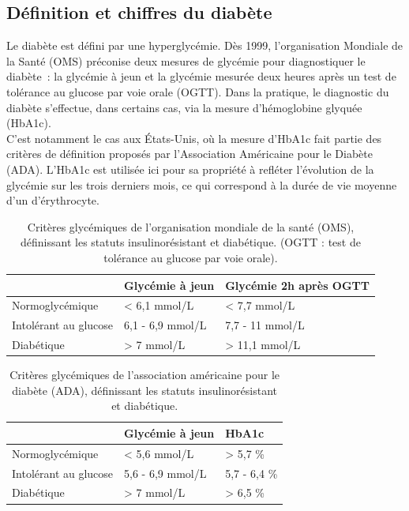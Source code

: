 \documentclass[11pt,a4paper,notrimn]{krantz}
\theoremstyle{definition}
\theoremstyle{definition}
\theoremstyle{remark}
\begin{document}
\subsection{Définition et chiffres du
diabète}\label{definition-et-chiffres-du-diabete}

Le diabète est défini par une hyperglycémie. Dès 1999, l'organisation
Mondiale de la Santé (OMS)
\citep{world_health_organization_definition_1999} préconise deux mesures
de glycémie pour diagnostiquer le diabète~: la glycémie à jeun et la
glycémie mesurée deux heures après un test de tolérance au glucose par
voie orale (OGTT). Dans la pratique, le diagnostic du diabète
s'effectue, dans certains cas, via la mesure d'hémoglobine glyquée
(HbA1c).\\
C'est notamment le cas aux États-Unis, où la mesure d'HbA1c fait partie
des critères de définition proposés par l'Association Américaine pour le
Diabète (ADA). L'HbA1c est utilisée ici pour sa propriété à refléter
l'évolution de la glycémie sur les trois derniers mois, ce qui
correspond à la durée de vie moyenne d'un d'érythrocyte.

\begin{table}

\caption{\label{tab:t2ddefinitionOMS}Critères glycémiques de l'organisation mondiale de la santé (OMS), définissant les statuts insulinorésistant et diabétique. (OGTT : test de tolérance au glucose par voie orale).}
\centering
\begin{tabular}[t]{lll}
\toprule
 & Glycémie à jeun & Glycémie 2h après OGTT\\
\midrule
Normoglycémique & < 6,1 mmol/L & < 7,7 mmol/L\\
Intolérant au glucose & 6,1 - 6,9 mmol/L & 7,7 - 11 mmol/L\\
Diabétique & > 7 mmol/L & > 11,1 mmol/L\\
\bottomrule
\end{tabular}
\end{table}

\begin{table}

\caption{\label{tab:t2ddefinitionADA}Critères glycémiques de l'association américaine pour le diabète (ADA), définissant les statuts insulinorésistant et diabétique.}
\centering
\begin{tabular}[t]{lll}
\toprule
 & Glycémie à jeun & HbA1c\\
\midrule
Normoglycémique & < 5,6 mmol/L & > 5,7 \%\\
Intolérant au glucose & 5,6 - 6,9 mmol/L & 5,7 - 6,4 \%\\
Diabétique & > 7 mmol/L & > 6,5 \%\\
\bottomrule
\end{tabular}
\end{table}
\end{document}
